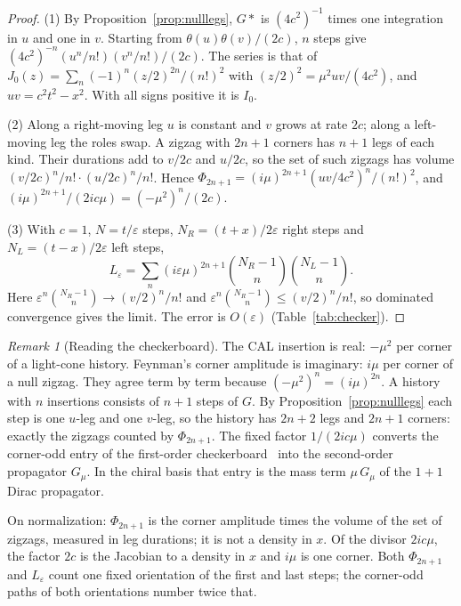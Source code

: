\documentclass[11pt]{amsart}
\theoremstyle{definition}
\theoremstyle{remark}
\newtheorem{remark}[theorem]{Remark}
\newcommand{\eps}{\varepsilon}
\begin{document}
\begin{proof}
(1) By Proposition~\ref{prop:nulllegs}, $G*$ is $(4c^2)^{-1}$ times one integration in $u$ and one in $v$. Starting from $\theta(u)\theta(v)/(2c)$, $n$ steps give $(4c^2)^{-n}(u^n/n!)(v^n/n!)/(2c)$. The series is that of $J_0(z)=\sum_n(-1)^n(z/2)^{2n}/(n!)^2$ with $(z/2)^2=\mu^2uv/(4c^2)$, and $uv=c^2t^2-x^2$. With all signs positive it is $I_0$.

(2) Along a right-moving leg $u$ is constant and $v$ grows at rate $2c$; along a left-moving leg the roles swap. A zigzag with $2n+1$ corners has $n+1$ legs of each kind. Their durations add to $v/2c$ and $u/2c$, so the set of such zigzags has volume $(v/2c)^n/n!\cdot(u/2c)^n/n!$. Hence $\Phi_{2n+1}=(i\mu)^{2n+1}(uv/4c^2)^n/(n!)^2$, and $(i\mu)^{2n+1}/(2ic\mu)=(-\mu^2)^n/(2c)$.

(3) With $c=1$, $N=t/\eps$ steps, $N_R=(t+x)/2\eps$ right steps and $N_L=(t-x)/2\eps$ left steps,
\[
L_\eps=\sum_n(i\eps\mu)^{2n+1}\binom{N_R-1}{n}\binom{N_L-1}{n}.
\]
Here $\eps^n\binom{N_R-1}{n}\to(v/2)^n/n!$ and $\eps^n\binom{N_R-1}{n}\le(v/2)^n/n!$, so dominated convergence gives the limit. The error is $O(\eps)$ (Table~\ref{tab:checker}).
\end{proof}

\begin{remark}[Reading the checkerboard]\label{rem:checker}
The CAL insertion is real: $-\mu^2$ per corner of a light-cone history. Feynman's corner amplitude is imaginary: $i\mu$ per corner of a null zigzag. They agree term by term because $(-\mu^2)^n=(i\mu)^{2n}$. A history with $n$ insertions consists of $n+1$ steps of $G$. By Proposition~\ref{prop:nulllegs} each step is one $u$-leg and one $v$-leg, so the history has $2n+2$ legs and $2n+1$ corners: exactly the zigzags counted by $\Phi_{2n+1}$. The fixed factor $1/(2ic\mu)$ converts the corner-odd entry of the first-order checkerboard~\cite{FH,JS} into the second-order propagator $G_\mu$. In the chiral basis that entry is the mass term $\mu\,G_\mu$ of the $1+1$ Dirac propagator.

On normalization: $\Phi_{2n+1}$ is the corner amplitude times the volume of the set of zigzags, measured in leg durations; it is not a density in $x$. Of the divisor $2ic\mu$, the factor $2c$ is the Jacobian to a density in $x$ and $i\mu$ is one corner. Both $\Phi_{2n+1}$ and $L_\eps$ count one fixed orientation of the first and last steps; the corner-odd paths of both orientations number twice that.
\end{remark}
\end{document}
